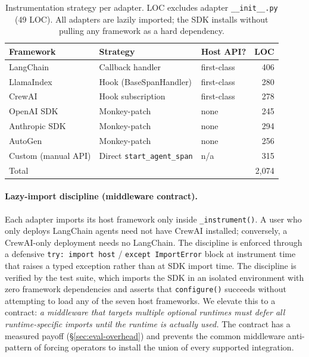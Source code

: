 \documentclass[sigconf,review,anonymous,9pt]{acmart}
\begin{document}
\begin{table}[t]
\centering
\small
\caption{Instrumentation strategy per adapter. LOC excludes adapter
\texttt{\_\_init\_\_.py} (49 LOC). All adapters are lazily imported;
the SDK installs without pulling any framework as a hard dependency.}
\label{tab:adapters}
\begin{tabular}{@{}lllr@{}}
\toprule
\textbf{Framework} & \textbf{Strategy} & \textbf{Host API?} & \textbf{LOC} \\
\midrule
LangChain~\cite{langchain}        & Callback handler        & first-class & 406 \\
LlamaIndex~\cite{llamaindex}      & Hook (BaseSpanHandler)  & first-class & 280 \\
CrewAI~\cite{crewai}              & Hook subscription       & first-class & 278 \\
OpenAI SDK~\cite{openai_sdk}      & Monkey-patch            & none        & 245 \\
Anthropic SDK~\cite{anthropic_sdk}& Monkey-patch            & none        & 294 \\
AutoGen~\cite{autogen}            & Monkey-patch            & none        & 256 \\
Custom (manual API)               & Direct \texttt{start\_agent\_span} & n/a & 315 \\
\midrule
Total                                                 &     &           & 2{,}074 \\
\bottomrule
\end{tabular}
\end{table}

\paragraph{Lazy-import discipline (middleware contract).}
Each adapter imports its host framework only inside
\texttt{\_instrument()}. A user who only deploys LangChain agents
need not have CrewAI installed; conversely, a CrewAI-only deployment
needs no LangChain. The discipline is enforced through a defensive
\texttt{try: import host} / \texttt{except ImportError} block at
instrument time that raises a typed exception rather than at SDK
import time. The discipline is verified by the test suite, which
imports the SDK in an isolated environment with zero framework
dependencies and asserts that \texttt{configure()} succeeds without
attempting to load any of the seven host frameworks. We elevate this
to a contract: \emph{a middleware that targets multiple optional
runtimes must defer all runtime-specific imports until the runtime is
actually used.} The contract has a measured payoff
(\S\ref{sec:eval-overhead}) and prevents the common middleware
anti-pattern of forcing operators to install the union of every
supported integration.
\end{document}
